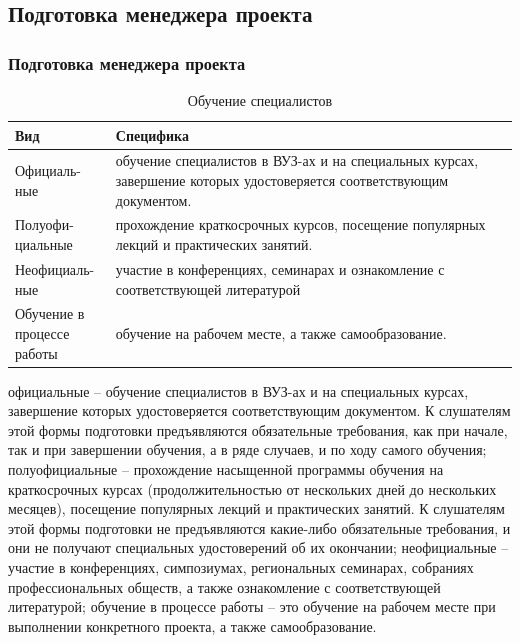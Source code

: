 \documentclass{../industrial-development}
\begin{document}
\subsection{Подготовка менеджера проекта}
\begin{frame} \frametitle{Подготовка менеджера проекта}

	 	\begin{table}[H]
\caption{\label{tab:canonsummary} Обучение специалистов}
\begin{center}
\begin{tabular}{|p{0.2\linewidth}|p{0.8\linewidth}|}
\hline
\textbf{Вид} & \textbf{Специфика} \\
\hline
Официаль-ные &  обучение специалистов в ВУЗ-ах и на специальных курсах, завершение которых удостоверяется соответствующим документом. \\
\hline
Полуофи-циальные  & прохождение краткосрочных курсов, посещение популярных лекций и практических занятий. \\
\hline
Неофициаль-ные &  участие в конференциях, семинарах и ознакомление с соответствующей литературой \\
\hline
Обучение в процессе работы & обучение на рабочем месте, а также самообразование. \\
\hline
\end{tabular}
\end{center}
\end{table} 
\end{frame}
\lecturenotes
официальные – обучение специалистов в ВУЗ-ах и на специальных курсах, завершение которых удостоверяется соответствующим документом. К слушателям этой формы подготовки предъявляются обязательные требования, как при начале, так и при завершении обучения, а в ряде случаев, и по ходу самого обучения;
полуофициальные – прохождение насыщенной программы обучения на краткосрочных курсах (продолжительностью от нескольких дней до нескольких месяцев), посещение популярных лекций и практических занятий. К слушателям этой формы подготовки не предъявляются какие-либо обязательные требования, и они не получают специальных удостоверений об их окончании;
неофициальные – участие в конференциях, симпозиумах, региональных семинарах, собраниях профессиональных обществ, а также ознакомление с соответствующей литературой;
обучение в процессе работы – это обучение на рабочем месте при выполнении конкретного проекта, а также самообразование.
\end{document}
